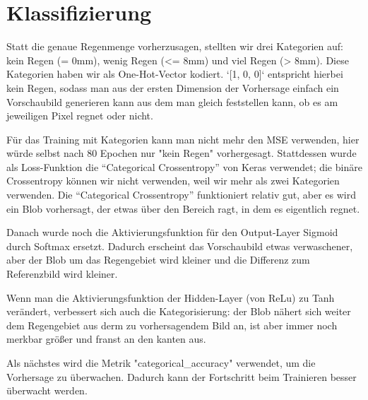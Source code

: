 \section{Klassifizierung}
Statt die genaue Regenmenge vorherzusagen, stellten wir drei Kategorien auf: kein Regen (= 0mm), wenig Regen (<= 8mm) und viel Regen (> 8mm). Diese Kategorien haben wir als One-Hot-Vector kodiert. `[1, 0, 0]` entspricht hierbei kein Regen, sodass man aus der ersten Dimension der Vorhersage einfach ein Vorschaubild generieren kann aus dem man gleich feststellen kann, ob es am jeweiligen Pixel regnet oder nicht.

Für das Training mit Kategorien kann man nicht mehr den MSE verwenden, hier würde selbst nach 80 Epochen nur "kein Regen" vorhergesagt. Stattdessen wurde als Loss-Funktion die \enquote{Categorical Crossentropy} von Keras verwendet; die binäre Crossentropy können wir nicht verwenden, weil wir mehr als zwei Kategorien verwenden. Die \enquote{Categorical Crossentropy} funktioniert relativ gut, aber es wird ein Blob vorhersagt, der etwas über den Bereich ragt, in dem es eigentlich regnet.

Danach wurde noch die Aktivierungsfunktion für den Output-Layer Sigmoid durch Softmax ersetzt. Dadurch erscheint das Vorschaubild etwas verwaschener, aber der Blob um das Regengebiet wird kleiner und die Differenz zum Referenzbild wird kleiner.

Wenn man die Aktivierungsfunktion der Hidden-Layer (von ReLu) zu Tanh verändert, verbessert sich auch die Kategorisierung: der Blob nähert sich weiter dem Regengebiet aus derm zu vorhersagendem Bild an, ist aber immer noch merkbar größer und franst an den kanten aus.

Als nächstes wird die Metrik "categorical\_accuracy" verwendet, um die Vorhersage zu überwachen. Dadurch kann der Fortschritt beim Trainieren besser überwacht werden.


